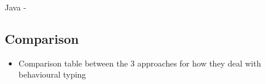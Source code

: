 Java - \cite{HY2016}

\subsection{Comparison}
\begin{itemize}
\item Comparison table between the 3 approaches for how they deal with behavioural typing 
\end{itemize}